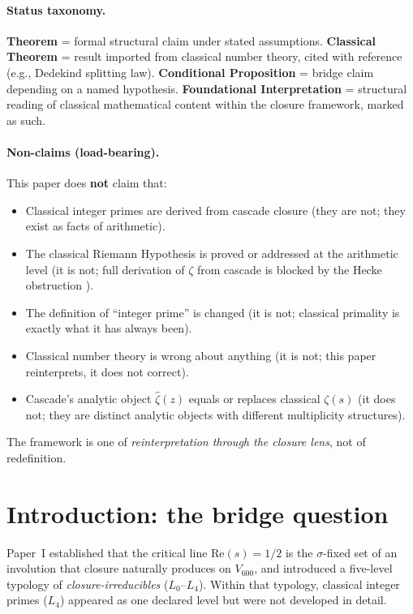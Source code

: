 \documentclass[11pt,a4paper]{article}
\theoremstyle{definition}
\theoremstyle{remark}
\begin{document}
\paragraph{Status taxonomy.}
\textbf{Theorem} = formal structural claim under stated assumptions.
\textbf{Classical Theorem} = result imported from classical number theory,
cited with reference (e.g., Dedekind splitting law).
\textbf{Conditional Proposition} = bridge claim depending on a named
hypothesis. \textbf{Foundational Interpretation} = structural reading
of classical mathematical content within the closure framework, marked
as such.

\paragraph{Non-claims (load-bearing).}
This paper does \textbf{not} claim that:
\begin{itemize}\itemsep0pt
  \item Classical integer primes are derived from cascade closure (they are not; they exist as facts of arithmetic).
  \item The classical Riemann Hypothesis is proved or addressed at the arithmetic level (it is not; full derivation of $\zeta$ from cascade is blocked by the Hecke obstruction \cite{rhFormalSmart}).
  \item The definition of ``integer prime'' is changed (it is not; classical primality is exactly what it has always been).
  \item Classical number theory is wrong about anything (it is not; this paper reinterprets, it does not correct).
  \item Cascade's analytic object $\hat{\zeta}(z)$ equals or replaces classical $\zeta(s)$ (it does not; they are distinct analytic objects with different multiplicity structures).
\end{itemize}
The framework is one of \emph{reinterpretation through the closure
lens}, not of redefinition.

\section{Introduction: the bridge question}\label{sec:intro}

Paper~I established that the critical line $\mathrm{Re}(s) = 1/2$ is the
$\sigma$-fixed set of an involution that closure naturally produces on
$V_{600}$, and introduced a five-level typology of
\emph{closure-irreducibles} ($L_0$--$L_4$). Within that typology,
classical integer primes ($L_4$) appeared as one declared level but were
not developed in detail.
\end{document}
